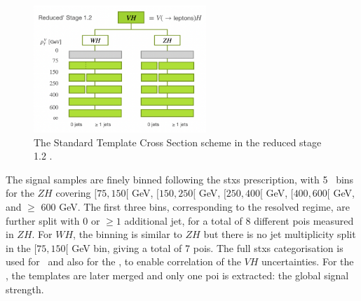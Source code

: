 \begin{figure}[!htbp]
    \centering
    \includegraphics[width=0.58\textwidth]{Images/VH/Model/STXSsketch.png}
    \caption{The Standard Template Cross Section scheme in the reduced stage 1.2 \cite{berger2019simplified}.}
    \label{fig:model-stxsscheme}
\end{figure}

The signal samples are finely binned following the \gls{stxs} prescription, with 5 \ptv\ bins for the $ZH$ covering $[75, 150[$ GeV, $[150, 250[$ GeV, $[250, 400[$ GeV, $[400, 600[$ GeV, and $\geq$ 600 GeV. The first three bins, corresponding to the resolved regime, are further split with 0 or $\geq 1$ additional jet, for a total of 8 different \glspl{poi} measured in $ZH$. For $WH$, the binning is similar to $ZH$ but there is no jet multiplicity split in the $[75, 150[$ GeV bin, giving a total of 7 \glspl{poi}. The full \gls{stxs} categorisation is used for \vhb\ and also for the \vhc, to enable correlation of the $VH$ uncertainties. For the \vhc, the templates are later merged and only one \gls{poi} is extracted: the global signal strength.\\
  
